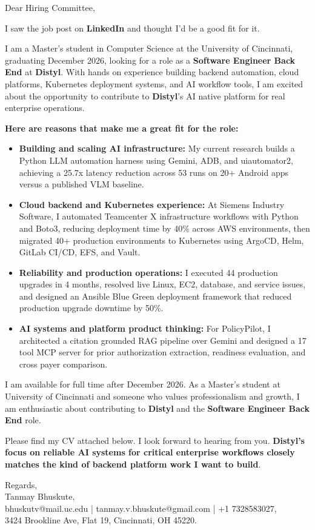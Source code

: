\documentclass[11pt]{letter}
\date{}
\begin{document}
\begin{letter}{}

\opening{Dear Hiring Committee,}

I saw the job post on \textbf{LinkedIn} and thought I'd be a good fit for it.

I am a Master's student in Computer Science at the University of Cincinnati, graduating December 2026, looking for a role as a \textbf{Software Engineer Back End} at \textbf{Distyl}. With hands on experience building backend automation, cloud platforms, Kubernetes deployment systems, and AI workflow tools, I am excited about the opportunity to contribute to \textbf{Distyl}'s AI native platform for real enterprise operations.

\textbf{Here are reasons that make me a great fit for the role:}

\begin{itemize}[leftmargin=*, itemsep=0.42em]
    \item \textbf{Building and scaling AI infrastructure:} My current research builds a Python LLM automation harness using Gemini, ADB, and uiautomator2, achieving a 25.7x latency reduction across 53 runs on 20+ Android apps versus a published VLM baseline.

    \item \textbf{Cloud backend and Kubernetes experience:} At Siemens Industry Software, I automated Teamcenter X infrastructure workflows with Python and Boto3, reducing deployment time by 40\% across AWS environments, then migrated 40+ production environments to Kubernetes using ArgoCD, Helm, GitLab CI/CD, EFS, and Vault.

    \item \textbf{Reliability and production operations:} I executed 44 production upgrades in 4 months, resolved live Linux, EC2, database, and service issues, and designed an Ansible Blue Green deployment framework that reduced production upgrade downtime by 50\%.

    \item \textbf{AI systems and platform product thinking:} For PolicyPilot, I architected a citation grounded RAG pipeline over Gemini and designed a 17 tool MCP server for prior authorization extraction, readiness evaluation, and cross payer comparison.
\end{itemize}

I am available for full time after December 2026. As a Master's student at University of Cincinnati and someone who values professionalism and growth, I am enthusiastic about contributing to \textbf{Distyl} and the \textbf{Software Engineer Back End} role.

Please find my CV attached below. I look forward to hearing from you. \textbf{Distyl's focus on reliable AI systems for critical enterprise workflows closely matches the kind of backend platform work I want to build}.

{\setlength{\parskip}{0pt}
Regards,\\
Tanmay Bhuskute,\\
bhuskutv@mail.uc.edu | tanmay.v.bhuskute@gmail.com | +1 7328583027,\\
3424 Brookline Ave, Flat 19, Cincinnati, OH 45220.
}

\end{letter}
\end{document}
